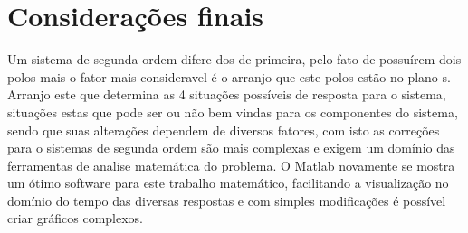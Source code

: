 \documentclass[paper=a4, fontsize=11pt]{article}
\begin{document}
\section{Considerações finais}

Um sistema de segunda ordem difere dos de primeira, pelo fato de possuírem dois polos
mais o fator mais consideravel é o arranjo que este polos estão no plano-s. 
Arranjo este que determina as 4 situações possíveis de resposta para o sistema, 
situações estas que pode ser ou não bem vindas para os componentes do sistema, 
sendo que suas alterações dependem de diversos fatores,  com isto as correções 
para o sistemas de segunda ordem são mais complexas e exigem
um domínio das ferramentas de analise matemática do problema. O Matlab novamente
se mostra um ótimo software para este trabalho matemático, facilitando a visualização
no domínio do tempo das diversas respostas e com simples modificações é possível
criar gráficos complexos.
\end{document}
